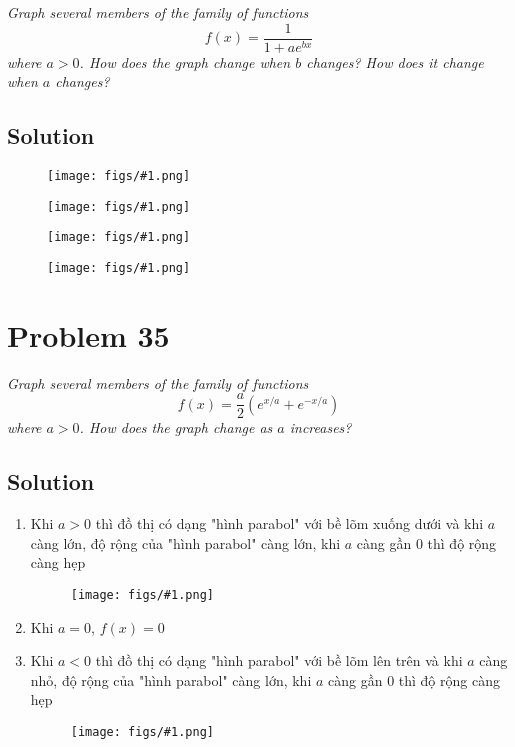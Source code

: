 \documentclass[11pt]{article}
\newcommand{\soln}{\subsection*}
\newcommand{\qn}{\textit}
\newcommand{\imgsoln}[1]{
	\begin{figure}[H]
		\centering
		\texttt{[image: figs/\#1.png]}
	\end{figure}
}
\begin{document}
\qn{Graph several members of the family of functions $$f(x)=\frac{1}{1+ae^{bx}}$$ where $a>0$. How does the graph change when $b$ changes? How does it change when $a$ changes?}

\soln{Solution}
\imgsoln{1.4.34-ans.1}
\imgsoln{1.4.34-ans.2}
\imgsoln{1.4.34-ans.3}
\imgsoln{1.4.34-ans.4}

\section*{Problem 35}

\qn{Graph several members of the family of functions $$f(x)=\frac{a}{2}(e^{x/a}+e^{-x/a})$$ where $a>0$. How does the graph change as $a$ increases?}

\soln{Solution}
\begin{enumerate}
	\item Khi $a>0$ thì đồ thị có dạng "hình parabol" với bề lõm xuống dưới và khi $a$ càng lớn, độ rộng của "hình parabol" càng lớn, khi $a$ càng gần 0 thì độ rộng càng hẹp
	\imgsoln{1.4.35-ans.1}
	\item Khi $a=0$, $f(x)=0$
	\item Khi $a<0$ thì đồ thị có dạng "hình parabol" với bề lõm lên trên và khi $a$ càng nhỏ, độ rộng của "hình parabol" càng lớn, khi $a$ càng gần 0 thì độ rộng càng hẹp
	\imgsoln{1.4.35-ans.2}
\end{enumerate}
\end{document}

